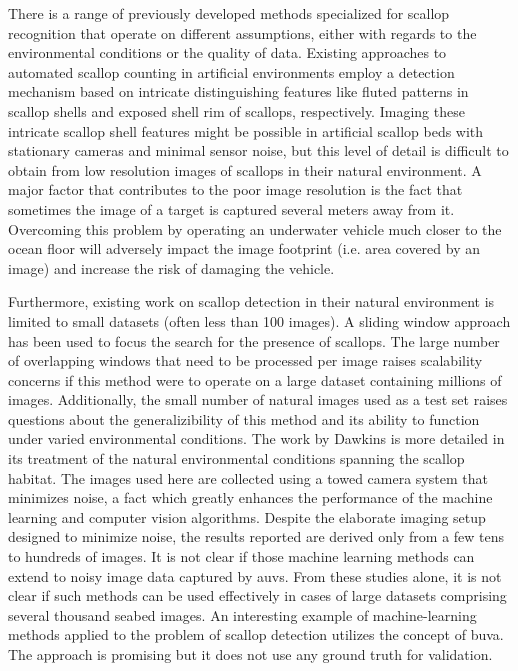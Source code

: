 There is a range of previously developed methods specialized for scallop recognition 
\cite{dawkings13,guomundsson,enomoto9,enomoto10,fearn, prasanna_med, prasanna_aslo, prasanna_igi} 
that operate on different assumptions, either with regards to the environmental conditions or the quality of data.
Existing approaches to automated scallop counting in artificial environments
 \cite{enomoto9, enomoto10} employ a detection mechanism based on intricate distinguishing features 
like fluted patterns in scallop shells and exposed shell rim of scallops, respectively.
Imaging these intricate scallop shell features might
be possible in artificial scallop beds with stationary cameras and 
minimal sensor noise, but this level of detail 
is difficult to obtain from low resolution images of scallops in their natural environment. 
A major factor that contributes to the poor image resolution is the fact that sometimes the image of a target
is captured several meters away from it. 
Overcoming this problem by operating an underwater vehicle much closer to the ocean floor 
will adversely impact the image footprint (i.e. area covered by an image) and increase the risk of damaging the vehicle.

Furthermore, existing work on scallop detection \cite{dawkings13, guomundsson} in their natural
environment is limited to small datasets (often less than 100 images). 
A sliding window approach has been used \cite{guomundsson} to focus the search for the presence of scallops. The large number of overlapping windows that need to be processed per image raises scalability concerns if this method were to operate 
on a large dataset containing millions of images. Additionally, the small number of natural images used as a test set raises questions about the generalizibility of this method and its ability to function under varied environmental conditions.
The work by Dawkins \cite{dawkings13} is more detailed in its treatment of the natural environmental conditions spanning the scallop habitat. The images used here are collected using a towed camera system that minimizes noise, a fact which greatly enhances the performance of the machine learning and computer vision algorithms. Despite the elaborate imaging setup designed to minimize noise, the results reported are derived only from a few tens to hundreds of images.
It is not clear if those machine learning methods \cite{dawkings13} can extend to noisy image data captured by \gls{auv}s.
From these studies alone, it is not clear if such methods can be used effectively
in cases of large datasets comprising several thousand seabed images.
An interesting example of machine-learning methods applied to the
problem of scallop detection \cite{fearn} 
utilizes the concept of \gls{buva}.
The approach is promising but it does not use any ground truth for validation.  

